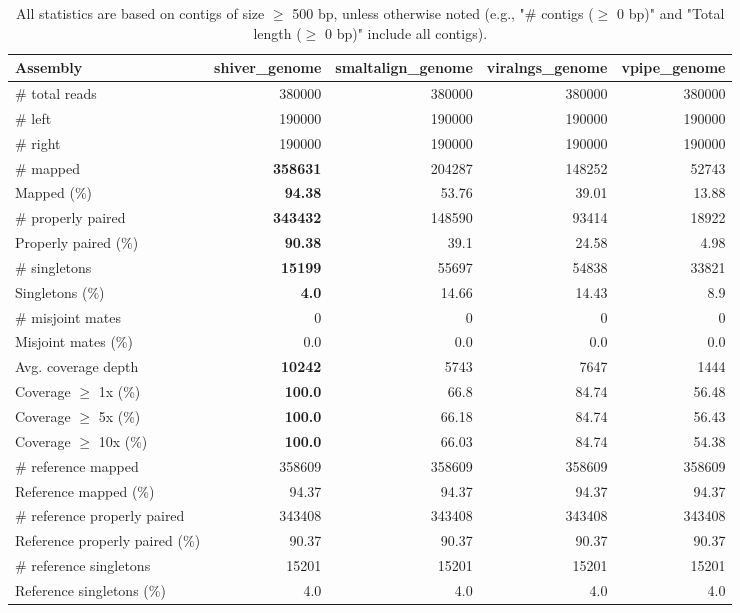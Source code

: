 \documentclass[12pt,a4paper]{article}
\begin{document}
\begin{table}[ht]
\begin{center}
\caption{All statistics are based on contigs of size $\geq$ 500 bp, unless otherwise noted (e.g., "\# contigs ($\geq$ 0 bp)" and "Total length ($\geq$ 0 bp)" include all contigs).}
\begin{tabular}{|l*{4}{|r}|}
\hline
Assembly & shiver\_genome & smaltalign\_genome & viralngs\_genome & vpipe\_genome \\ \hline
\# total reads & 380000 & 380000 & 380000 & 380000 \\ \hline
\# left & 190000 & 190000 & 190000 & 190000 \\ \hline
\# right & 190000 & 190000 & 190000 & 190000 \\ \hline
\# mapped & {\bf 358631} & 204287 & 148252 & 52743 \\ \hline
Mapped (\%) & {\bf 94.38} & 53.76 & 39.01 & 13.88 \\ \hline
\# properly paired & {\bf 343432} & 148590 & 93414 & 18922 \\ \hline
Properly paired (\%) & {\bf 90.38} & 39.1 & 24.58 & 4.98 \\ \hline
\# singletons & {\bf 15199} & 55697 & 54838 & 33821 \\ \hline
Singletons (\%) & {\bf 4.0} & 14.66 & 14.43 & 8.9 \\ \hline
\# misjoint mates & 0 & 0 & 0 & 0 \\ \hline
Misjoint mates (\%) & 0.0 & 0.0 & 0.0 & 0.0 \\ \hline
Avg. coverage depth & {\bf 10242} & 5743 & 7647 & 1444 \\ \hline
Coverage $\geq$ 1x (\%) & {\bf 100.0} & 66.8 & 84.74 & 56.48 \\ \hline
Coverage $\geq$ 5x (\%) & {\bf 100.0} & 66.18 & 84.74 & 56.43 \\ \hline
Coverage $\geq$ 10x (\%) & {\bf 100.0} & 66.03 & 84.74 & 54.38 \\ \hline
\# reference mapped & 358609 & 358609 & 358609 & 358609 \\ \hline
Reference mapped (\%) & 94.37 & 94.37 & 94.37 & 94.37 \\ \hline
\# reference properly paired & 343408 & 343408 & 343408 & 343408 \\ \hline
Reference properly paired (\%) & 90.37 & 90.37 & 90.37 & 90.37 \\ \hline
\# reference singletons & 15201 & 15201 & 15201 & 15201 \\ \hline
Reference singletons (\%) & 4.0 & 4.0 & 4.0 & 4.0 \\ \hline

\end{tabular}
\end{center}
\end{table}
\end{document}
